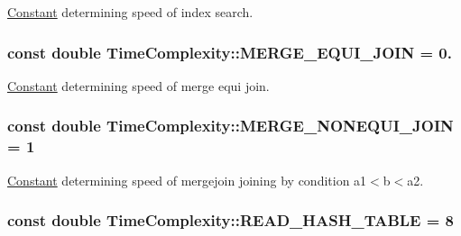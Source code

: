 \hyperlink{class_constant}{Constant} determining speed of index search. \hypertarget{class_time_complexity_a6d5c9703d95ebce5c94a159991de53b5}{
\subsubsection[{M\+E\+R\+G\+E\+\_\+\+E\+Q\+U\+I\+\_\+\+J\+O\+I\+N}]{\setlength{\rightskip}{0pt plus 5cm}const double Time\+Complexity\+::\+M\+E\+R\+G\+E\+\_\+\+E\+Q\+U\+I\+\_\+\+J\+O\+I\+N = 0.\hspace{0.3cm}{\ttfamily [static]}}}\label{class_time_complexity_a6d5c9703d95ebce5c94a159991de53b5}
\hyperlink{class_constant}{Constant} determining speed of merge equi join. \hypertarget{class_time_complexity_a5c7a2b2c29677f090bae490f57d486fa}{
\subsubsection[{M\+E\+R\+G\+E\+\_\+\+N\+O\+N\+E\+Q\+U\+I\+\_\+\+J\+O\+I\+N}]{\setlength{\rightskip}{0pt plus 5cm}const double Time\+Complexity\+::\+M\+E\+R\+G\+E\+\_\+\+N\+O\+N\+E\+Q\+U\+I\+\_\+\+J\+O\+I\+N = 1\hspace{0.3cm}{\ttfamily [static]}}}\label{class_time_complexity_a5c7a2b2c29677f090bae490f57d486fa}
\hyperlink{class_constant}{Constant} determining speed of mergejoin joining by condition a1$<$b$<$a2. \hypertarget{class_time_complexity_a7b47ef70ce9096d049a233c819c850de}{
\subsubsection[{R\+E\+A\+D\+\_\+\+H\+A\+S\+H\+\_\+\+T\+A\+B\+L\+E}]{\setlength{\rightskip}{0pt plus 5cm}const double Time\+Complexity\+::\+R\+E\+A\+D\+\_\+\+H\+A\+S\+H\+\_\+\+T\+A\+B\+L\+E = 8\hspace{0.3cm}{\ttfamily [static]}}}\label{class_time_complexity_a7b47ef70ce9096d049a233c819c850de}
